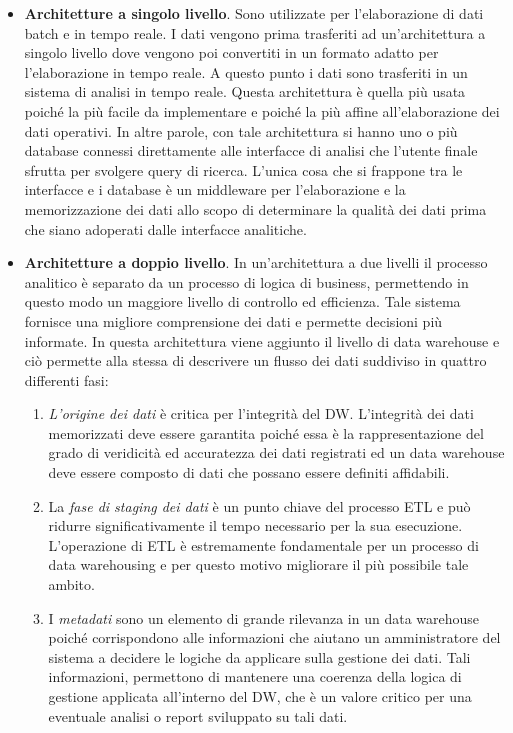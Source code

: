 \begin{itemize}
    \item \textbf{Architetture a singolo livello}. Sono utilizzate per l'elaborazione di dati batch e in tempo reale. I dati vengono prima trasferiti ad un'architettura a singolo livello dove vengono poi convertiti in un formato adatto per l'elaborazione in tempo reale. A questo punto i dati sono trasferiti in un sistema di analisi in tempo reale. Questa architettura è quella più usata poiché la più facile da implementare e poiché la più affine all'elaborazione dei dati operativi. In altre parole, con tale architettura si hanno uno o più database connessi direttamente alle interfacce di analisi che l'utente finale sfrutta per svolgere query di ricerca. L'unica cosa che si frappone tra le interfacce e i database è un middleware per l'elaborazione e la memorizzazione dei dati allo scopo di determinare la qualità dei dati prima che siano adoperati dalle interfacce analitiche.
    \item \textbf{Architetture a doppio livello}. In un'architettura a due livelli il processo analitico è separato da un processo di logica di business, permettendo in questo modo un maggiore livello di controllo ed efficienza. Tale sistema fornisce una migliore comprensione dei dati e permette decisioni più informate. In questa architettura viene aggiunto il livello di data warehouse e ciò permette alla stessa di descrivere un flusso dei dati suddiviso in quattro differenti fasi:
        \begin{enumerate}
            \item \textit{L'origine dei dati} è critica per l'integrità del DW. L'integrità dei dati memorizzati deve essere garantita poiché essa è la rappresentazione del grado di veridicità ed accuratezza dei dati registrati ed un data warehouse deve essere composto di dati che possano essere definiti affidabili.
            \item La \textit{fase di staging dei dati} è un punto chiave del processo ETL e può ridurre significativamente il tempo necessario per la sua esecuzione. L'operazione di ETL è estremamente fondamentale per un processo di data warehousing e per questo motivo migliorare il più possibile tale ambito.
            \item I \textit{metadati} sono un elemento di grande rilevanza in un data warehouse poiché corrispondono alle informazioni che aiutano un amministratore del sistema a decidere le logiche da applicare sulla gestione dei dati. Tali informazioni, permettono di mantenere una coerenza della logica di gestione applicata all'interno del DW, che è un valore critico per una eventuale analisi o report sviluppato su tali dati.

\end{enumerate}
\end{itemize}
